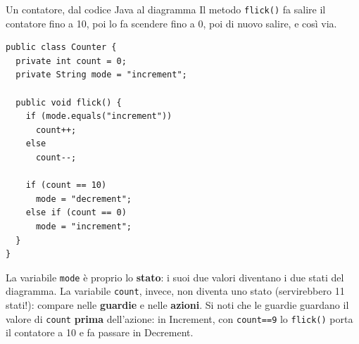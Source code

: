 \begin{esempio}{Un contatore, dal codice Java al diagramma}
Il metodo \texttt{flick()} fa salire il contatore fino a 10, poi lo fa scendere fino a 0, poi di nuovo salire, e così via.

\noindent\begin{minipage}[c]{0.44\textwidth}
\begin{lstlisting}[style=java]
public class Counter {
  private int count = 0;
  private String mode = "increment";

  public void flick() {
    if (mode.equals("increment"))
      count++;
    else
      count--;

    if (count == 10)
      mode = "decrement";
    else if (count == 0)
      mode = "increment";
  }
}
\end{lstlisting}
\end{minipage}\hfill
\begin{minipage}[c]{0.53\textwidth}
\centering
{}
\end{minipage}

\medskip
La variabile \texttt{mode} è proprio lo \textbf{stato}: i suoi due valori diventano i due stati del diagramma. La variabile
\texttt{count}, invece, non diventa uno stato (servirebbero 11 stati!): compare nelle \textbf{guardie} e nelle \textbf{azioni}.
Si noti che le guardie guardano il valore di \texttt{count} \textbf{prima} dell'azione: in Increment, con \texttt{count==9}
lo \texttt{flick()} porta il contatore a 10 e fa passare in Decrement.
\end{esempio}

